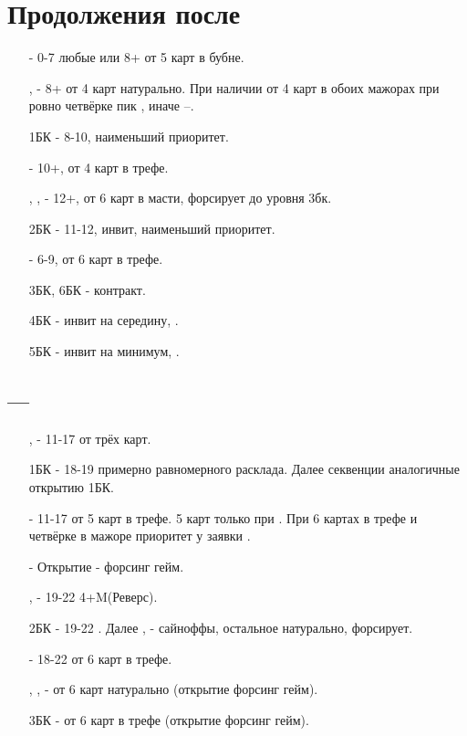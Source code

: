\documentclass{article}
\begin{document}
\section{Продолжения после }
\begin{enumerate}
    \item[\di{1}] - 0-7 любые или 8+ от 5 карт в бубне.
    \item[\he{1}, \sp{1}] - 8+ от 4 карт натурально. При наличии от 4 карт в обоих мажорах при ровно четвёрке пик , иначе --.
    \item[1БК] - 8-10, наименьший приоритет.
    \item[\cl{2}] - 10+, от 4 карт в трефе.
    \item[\di{2}, \he{2}, \sp{2}] - 12+, от 6 карт в масти, форсирует до уровня 3бк.
    \item[2БК] - 11-12, инвит, наименьший приоритет.
    \item[\cl{3}] - 6-9, от 6 карт в трефе. 
    \item[3БК, 6БК] - контракт.
    \item[4БК] - инвит на середину, .
    \item[5БК] - инвит на минимум,
    .
\end{enumerate}
\subsection{ --- }
\begin{enumerate}
    \item[\he{1}, \sp{1}] - 11-17 от трёх карт.
    \item[1БК] - 18-19 примерно равномерного расклада. Далее секвенции аналогичные открытию 1БК.
    \item[\cl{2}] - 11-17 от 5 карт в трефе. 5 карт только при . При 6 картах в трефе и четвёрке в мажоре приоритет у заявки .
    \item[\di{2}] - Открытие - форсинг гейм.
    \item[\he{2}, \sp{2}] - 19-22 4+M(Реверс). 
    \item[2БК] - 19-22 . Далее , - сайноффы, остальное натурально, форсирует.
    \item[\cl{3}] - 18-22 от 6 карт в трефе.
    \item[\di{3}, \he{3}, \sp{3}] - от 6 карт натурально (открытие форсинг гейм).
    \item[3БК] - от 6 карт в трефе (открытие форсинг гейм).
\end{enumerate}
\end{document}
